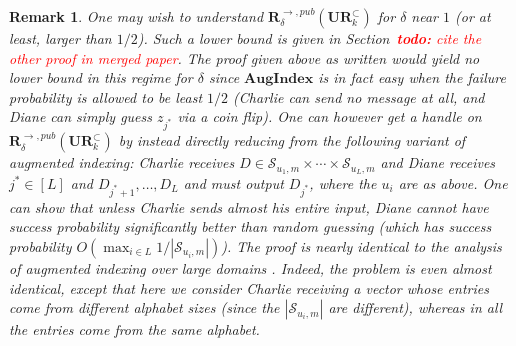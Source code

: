 \documentclass[11pt]{article}
\newcommand{\TODO}[1]{\textcolor{red}{\textbf{todo:} \textit{#1}}}
\newtheorem{remark}{Remark}
\newcommand{\aug}{\mathbf{AugIndex}\xspace}
\newcommand{\ur}{\mathbf{UR}\xspace}
\newcommand{\randcom}{\mathbf{R}}
\begin{document}
\begin{remark}
\textup{
One may wish to understand $\randcom^{\rightarrow,pub}_\delta(\ur_k^\subset)$ for $\delta$ near $1$ (or at least, larger than $1/2$). Such a lower bound is given in Section~\TODO{cite the other proof in merged paper}. The proof given above as written would yield no lower bound in this regime for $\delta$ since $\aug$ is in fact easy when the failure probability is allowed to be least $1/2$ (Charlie can send no message at all, and Diane can simply guess $z_{j^*}$ via a coin flip). One can however get a handle on $\randcom^{\rightarrow,pub}_\delta(\ur_k^\subset)$ by instead directly reducing from the following variant of augmented indexing: Charlie receives $D\in \mathcal S_{u_1,m}\times \cdots \times \mathcal S_{u_L, m}$ and Diane receives $j^*\in[L]$ and $D_{j^*+1},\ldots,D_L$ and must output $D_{j^*}$, where the $u_i$ are as above. One can show that unless Charlie sends almost his entire input, Diane cannot have success probability significantly better than random guessing (which has success probability $O(\max_{i\in L} 1/|\mathcal S_{u_i, m}|)$). The proof is nearly identical to the analysis of augmented indexing over large domains \cite{ErgunJS10,JayramW13}. Indeed, the problem is even almost identical, except that here we consider Charlie receiving a vector whose entries come from different alphabet sizes (since the $|\mathcal S_{u_i,m}|$ are different), whereas in \cite{ErgunJS10,JayramW13} all the entries come from the same alphabet.
}
\end{remark}



\end{document}
